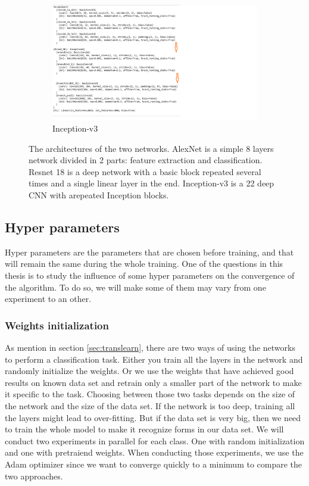 \begin{figure}
\begin{subfigure}{.5\textwidth}
  \includegraphics[width=.8\linewidth]{./figures/03_inception_architecture}
  \caption{Inception-v3}
  \label{fig:googarch}
\end{subfigure}
\caption[Networks architectures]{The architectures of the two networks. AlexNet is a simple 8 layers network divided in 2 parts: feature extraction and classification. Resnet 18 is a deep network with a basic block repeated several times and a single linear layer in the end. Inception-v3 is a 22 deep CNN with arepeated Inception blocks.}
\end{figure}

\subsection{Hyper parameters}
Hyper parameters are the parameters that are chosen before training, and that will remain the same during the whole training. One of the questions in this thesis is to study the influence of some hyper parameters on the  convergence of the algorithm. To do so, we will make some of them may vary from one experiment to an other. 

\subsubsection{Weights initialization}
As mention in section \ref{sec:translearn}, there are two ways of using the networks to perform a classification task. Either you train all the layers in the network and randomly initialize the weights. Or we use the weights that have achieved good results on known data set and retrain only a smaller part of the network to make it specific to the task.
Choosing between those two tasks depends on the size of the network and the size of the data set. If the network is too deep, training all the layers might lead to over-fitting. But if the data set is very big, then we need to train the whole model to make it recognize forms in our data set. 
We will conduct two experiments in parallel for each class. One with random initialization and one with pretraiend weights. 
When conducting those experiments, we use the Adam optimizer since we want to converge quickly to a minimum to compare the two approaches. 

